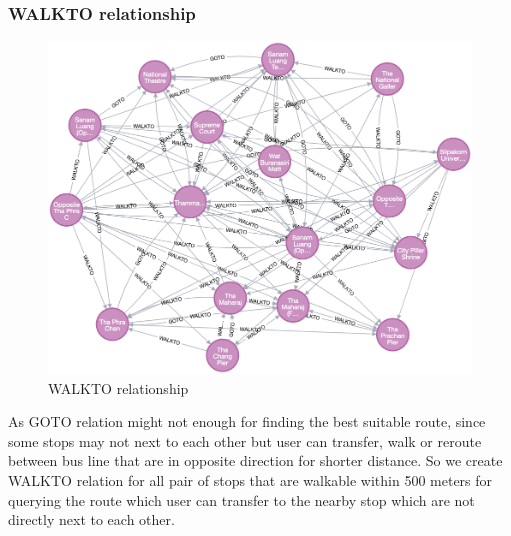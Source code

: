 \subsubsection{WALKTO relationship}
\begin{figure}[!h]
	\centering
	\includegraphics[width=1\linewidth]{chapter3/walkto_relationship.png}
	\caption{WALKTO relationship}
	\label{fig:WALKTO relationship}
\end{figure}
As GOTO relation might not enough for finding the best suitable route, since some stops may not next to each other but user can transfer, walk or reroute between bus line that are in opposite direction for shorter distance. So we create WALKTO relation for all pair of stops that are walkable within 500 meters for querying the route which user can transfer to the nearby stop which are not directly next to each other.

\newpage
